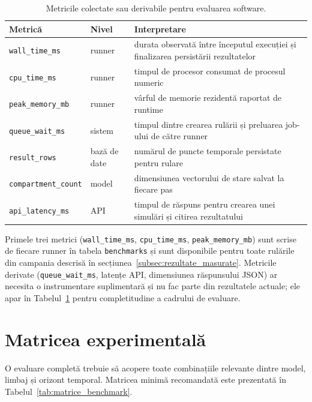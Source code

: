 \begin{table}[!htbp]
\centering
\caption[Metrici de evaluare software]{Metricile colectate sau derivabile pentru evaluarea software.}
\label{tab:metrici_benchmark}
\begin{tabularx}{0.95\textwidth}{l l X}
\toprule
\textbf{Metrică} & \textbf{Nivel} & \textbf{Interpretare} \\
\midrule
\texttt{wall\_time\_ms} & runner & durata observată între începutul execuției și finalizarea persistării rezultatelor \\
\texttt{cpu\_time\_ms} & runner & timpul de procesor consumat de procesul numeric \\
\texttt{peak\_memory\_mb} & runner & vârful de memorie rezidentă raportat de runtime \\
\texttt{queue\_wait\_ms} & sistem & timpul dintre crearea rulării și preluarea job-ului de către runner \\
\texttt{result\_rows} & bază de date & numărul de puncte temporale persistate pentru rulare \\
\texttt{compartment\_count} & model & dimensiunea vectorului de stare salvat la fiecare pas \\
\texttt{api\_latency\_ms} & API & timpul de răspuns pentru crearea unei simulări și citirea rezultatului \\
\bottomrule
\end{tabularx}
\end{table}

Primele trei metrici (\texttt{wall\_time\_ms}, \texttt{cpu\_time\_ms},
\texttt{peak\_memory\_mb}) sunt scrise de fiecare runner în tabela
\texttt{benchmarks} și sunt disponibile pentru toate rulările din campania
descrisă în secțiunea~\ref{subsec:rezultate_masurate}. Metricile derivate
(\texttt{queue\_wait\_ms}, latențe API, dimensiunea răspunsului JSON) ar
necesita o instrumentare suplimentară și nu fac parte din rezultatele
actuale; ele apar în Tabelul~\ref{tab:metrici_benchmark} pentru completitudine
a cadrului de evaluare.

\section{Matricea experimentală}
\label{sec:matrice_experimentala}

O evaluare completă trebuie să acopere toate combinațiile relevante dintre model,
limbaj și orizont temporal. Matricea minimă recomandată este prezentată în
Tabelul~\ref{tab:matrice_benchmark}.

